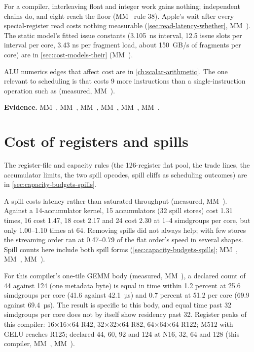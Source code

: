 For a compiler, interleaving float and integer work gains nothing; independent chains do, and eight reach
the floor (MM~ rule 38). Apple's wait after every special-register read costs nothing measurable (\cref{sec:read-latency-whether},
MM~). The static model's fitted issue constants (3.105~ns interval, 12.5 issue slots per interval per core, 3.43
ns per fragment load, about 150~GB/s of fragments per core) are in \cref{sec:cost-models-their} (MM~).

ALU numerics edges that affect cost are in \cref{ch:scalar-arithmetic}. The one relevant to scheduling is that  costs 9 more instructions
than a single-instruction operation such as  (measured, MM~).

\textbf{Evidence.} MM~, MM~, MM~, MM~, MM~, MM~.

\section{Cost of registers and spills}\label{sec:registers-spills-occupancy}

The register-file and capacity rules (the 126-register flat pool, the trade lines, the accumulator limits, the two
spill opcodes, spill cliffs as scheduling outcomes) are in \cref{sec:capacity-budgets-spills}.

A spill costs latency rather than saturated throughput (measured, MM~). Against a 14-accumulator kernel, 15
accumulators (32 spill stores) cost 1.31 times, 16 cost 1.47, 18 cost 2.17 and 24 cost 2.30 at 1–4 simdgroups per
core, but only 1.00–1.10 times at 64. Removing spills did not always help; with few stores the streaming order ran
at 0.47–0.79 of the flat order's speed in several shapes.
Spill counts here include both spill forms (\cref{sec:capacity-budgets-spills}; MM~, MM~, MM~).

For this compiler's one-tile GEMM body (measured, MM~), a declared count
of 44 against 124 (one metadata byte) is equal in time within 1.2 percent at 25.6 simdgroups per core (41.6 against
42.1~µs) and 0.7 percent at 51.2 per core (69.9 against 69.4~µs). The result is specific to this body, and equal time
past 32 simdgroups per core does not by itself show residency past 32.
Register peaks of this compiler: 16×16×64 R42, 32×32×64 R82, 64×64×64 R122; M512 with GELU reaches R125; declared 44,
60, 92 and 124 at N16, 32, 64 and 128 (this compiler, MM~, MM~).

